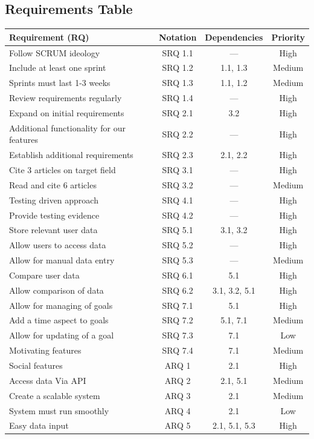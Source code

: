 \documentclass[11pt]{article}
\begin{document}
\subsection{Requirements Table} \label{sec:reqTable}
\begin{table}[!ht]
\begin{center}
\begin{tabular}{|l|c|c|c|}
    \hline 
    \textbf{Requirement (RQ)} & \textbf{Notation} & \textbf{Dependencies} & \textbf{Priority} \\ 
    \hline
    Follow SCRUM ideology & SRQ 1.1 & --- & High \\ 
    \hline
    Include at least one sprint & SRQ 1.2 & 1.1, 1.3 & Medium \\
    \hline
    Sprints must last 1-3 weeks & SRQ 1.3 & 1.1, 1.2 & Medium \\
    \hline
    Review requirements regularly & SRQ 1.4 & --- & High \\
    \hline
    Expand on initial requirements & SRQ 2.1 & 3.2 & High \\ 
    \hline
    Additional functionality for our features & SRQ 2.2 & --- & High \\
    \hline
    Establish additional requirements & SRQ 2.3 & 2.1, 2.2 & High \\ 
    \hline
    Cite 3 articles on target field & SRQ 3.1 & --- & High \\ 
    \hline
    Read and cite 6 articles & SRQ 3.2 & --- & Medium \\
    \hline
    Testing driven approach & SRQ 4.1 & --- & High \\ 
    \hline
    Provide testing evidence & SRQ 4.2 & --- & High \\
    \hline
    Store relevant user data & SRQ 5.1 & 3.1, 3.2 & High \\ 
    \hline
    Allow users to access data & SRQ 5.2 & --- & High \\ 
    \hline
    Allow for manual data entry & SRQ 5.3 & --- & Medium \\ 
    \hline
    Compare user data & SRQ 6.1 & 5.1 & High \\ 
    \hline
    Allow comparison of data & SRQ 6.2 & 3.1, 3.2, 5.1 & High \\
    \hline    
    Allow for managing of goals & SRQ 7.1 & 5.1 & High \\ 
    \hline
    Add a time aspect to goals & SRQ 7.2 & 5.1, 7.1 & Medium \\ 
    \hline
    Allow for updating of a goal & SRQ 7.3 & 7.1 & Low \\ 
    \hline
    Motivating features & SRQ 7.4 & 7.1 & Medium \\ 
    \hline
    Social features & ARQ 1 & 2.1 & High \\ 
    \hline 
    Access data Via API & ARQ 2 & 2.1, 5.1 & Medium \\
    \hline
    Create a scalable system & ARQ 3 & 2.1 & Medium \\ 
    \hline
    System must run smoothly & ARQ 4 & 2.1 & Low \\ 
    \hline
    Easy data input & ARQ 5 & 2.1, 5.1, 5.3 & High \\
    \hline


\end{tabular}
\end{center}
\end{table}
\end{document}
